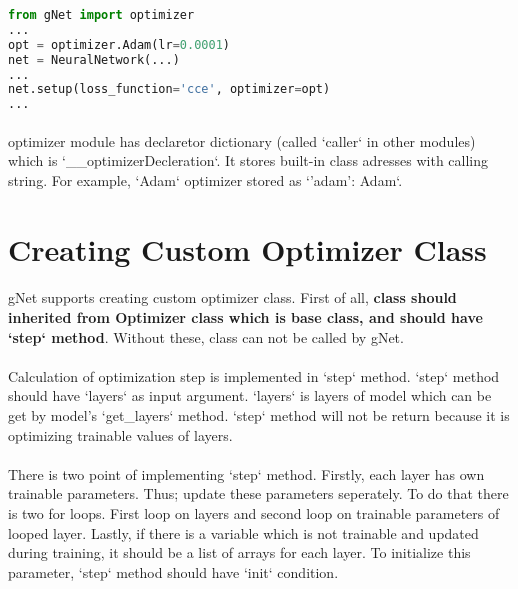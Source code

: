 \documentclass[12pt]{report}
\begin{document}
\begin{lstlisting}[language=Python, numbers=none, caption={Built-in optimizer with custom parameters.}, label={lis:optimizer-built-in-custom-params}]
from gNet import optimizer
...
opt = optimizer.Adam(lr=0.0001)
net = NeuralNetwork(...)
...
net.setup(loss_function='cce', optimizer=opt)
...
\end{lstlisting}

\paragraph{}
optimizer module has declaretor dictionary (called `caller` in other modules) which is `\_\_optimizerDecleration`. It stores built-in class adresses with calling string. For example, `Adam` optimizer stored as `'adam': Adam`.

\section{Creating Custom Optimizer Class}

\paragraph{}
gNet supports creating custom optimizer class. First of all, \textbf{class should inherited from Optimizer class which is base class, and should have `step` method}. Without these, class can not be called by gNet. 

\paragraph{}
Calculation of optimization step is implemented in `step` method. `step` method should have `layers` as input argument. `layers` is layers of model which can be get by model's `get\_layers` method. `step` method will not be return because it is optimizing trainable values of layers. 

\paragraph{}
There is two point of implementing `step` method. Firstly, each layer has own trainable parameters. Thus; update these parameters seperately. To do that there is two for loops. First loop on layers and second loop on trainable parameters of looped layer. Lastly, if there is a variable which is not trainable and updated during training, it should be a list of arrays for each layer. To initialize this parameter, `step` method should have `init` condition. 
\end{document}
